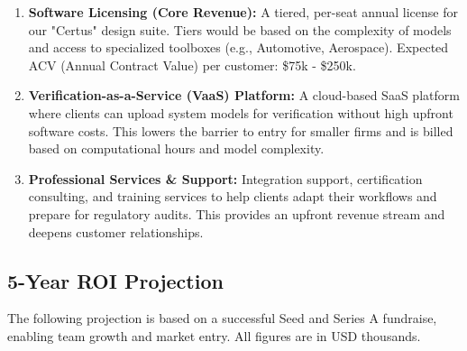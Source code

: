 \documentclass{article}
\begin{document}
\begin{enumerate}
    \item \textbf{Software Licensing (Core Revenue):} A tiered, per-seat annual license for our "Certus" design suite. Tiers would be based on the complexity of models and access to specialized toolboxes (e.g., Automotive, Aerospace). Expected ACV (Annual Contract Value) per customer: \$75k - \$250k.
    \item \textbf{Verification-as-a-Service (VaaS) Platform:} A cloud-based SaaS platform where clients can upload system models for verification without high upfront software costs. This lowers the barrier to entry for smaller firms and is billed based on computational hours and model complexity.
    \item \textbf{Professional Services \& Support:} Integration support, certification consulting, and training services to help clients adapt their workflows and prepare for regulatory audits. This provides an upfront revenue stream and deepens customer relationships.
\end{enumerate}

\subsection{5-Year ROI Projection}
The following projection is based on a successful Seed and Series A fundraise, enabling team growth and market entry. All figures are in USD thousands.
\end{document}
